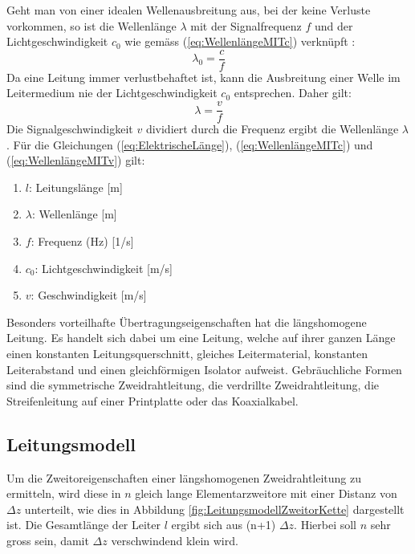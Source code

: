 Geht man von einer idealen Wellenausbreitung aus, bei der keine Verluste vorkommen, so ist die Wellenlänge $\lambda$ mit der Signalfrequenz $f$ und der Lichtgeschwindigkeit $c_0$ wie gemäss (\ref{eq:WellenlängeMITc}) verknüpft \cite{Tekom}:
\begin{equation}
\lambda_{0}=\dfrac{c}{f}\label{eq:WellenlängeMITc}
\end{equation}
Da eine Leitung immer verlustbehaftet ist, kann die Ausbreitung einer Welle im Leitermedium nie der Lichtgeschwindigkeit $c_0$ entsprechen. Daher gilt:
\begin{equation}
\lambda=\dfrac{v}{f}\label{eq:WellenlängeMITv}
\end{equation}
Die Signalgeschwindigkeit $v$ dividiert durch die Frequenz ergibt die Wellenlänge $\lambda$. Für die Gleichungen (\ref{eq:ElektrischeLänge}), (\ref{eq:WellenlängeMITc}) und (\ref{eq:WellenlängeMITv}) gilt:
\begin{enumerate}[leftmargin=2cm]
   \item[] $l$: Leitungslänge [m] 
   \item[] $\lambda$: Wellenlänge  [m] 
   \item[] $f$: Frequenz (Hz) [1/s] 
   \item[] $c_0$: Lichtgeschwindigkeit  [m/s] 
   \item[] $v$: Geschwindigkeit  [m/s] 
\end{enumerate} 
Besonders vorteilhafte Übertragungseigenschaften hat die längshomogene Leitung. Es handelt sich dabei um eine Leitung, welche auf ihrer ganzen Länge einen konstanten Leitungsquerschnitt, gleiches
Leitermaterial, konstanten Leiterabstand und einen gleichförmigen Isolator aufweist. Gebräuchliche Formen sind die symmetrische Zweidrahtleitung, die verdrillte Zweidrahtleitung, die Streifenleitung auf einer Printplatte oder das Koaxialkabel.
\subsection{Leitungsmodell}
Um die Zweitoreigenschaften einer längshomogenen Zweidrahtleitung zu ermitteln, wird diese in $n$ gleich lange Elementarzweitore mit einer Distanz von $\Delta z$ unterteilt, wie dies in Abbildung \ref{fig:LeitungsmodellZweitorKette} dargestellt ist. Die Gesamtlänge der Leiter $l$ ergibt sich aus (n+1) $\Delta z$. Hierbei soll $n$ sehr gross sein, damit $\Delta z$ verschwindend klein wird.

